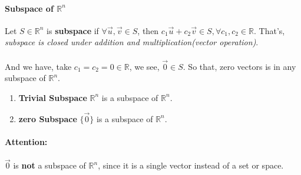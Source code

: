 \documentclass{article}
\begin{document}
	\paragraph{}

	\paragraph{Subspace of $\mathbb{R}^n$} Let $S \in \mathbb{R}^n$ is \textbf{subspace} if $\forall \vec{u},\vec{v} \in S$, then $c_1 \vec{u} + c_2 \vec{v} \in S, \forall c_1, c_2 \in \mathbb{R}$. That's, \emph{subspace is closed under addition and multiplication(vector operation)}.
	\paragraph{}And we have, take $c_1 = c_2 = 0 \in \mathbb{R}$, we see, $\vec{0} \in S$. So that, zero vectors is in any subspace of $\mathbb{R}^n$.
	\begin{enumerate}
		\item \textbf{Trivial Subspace} $\mathbb{R}^n$ is a subspace of $\mathbb{R}^n$.
		\item \textbf{zero Subspace} $\{\vec{0}\}$ is a subspace of $\mathbb{R}^n$.
	\end{enumerate}
	\paragraph{Attention:} $\vec{0}$ is \textbf{not} a subspace of $\mathbb{R}^n$, since it is a single vector instead of a set or space.
\end{document}

